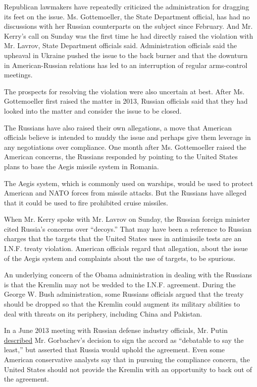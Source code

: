 Republican lawmakers have repeatedly criticized the administration for
dragging its feet on the issue. Ms. Gottemoeller, the State Department
official, has had no discussions with her Russian counterparts on the
subject since February. And Mr. Kerry's call on Sunday was the first
time he had directly raised the violation with Mr. Lavrov, State
Department officials said. Administration officials said the upheaval in
Ukraine pushed the issue to the back burner and that the downturn in
American-Russian relations has led to an interruption of regular
arms-control meetings.

The prospects for resolving the violation were also uncertain at best.
After Ms. Gottemoeller first raised the matter in 2013, Russian
officials said that they had looked into the matter and consider the
issue to be closed.

The Russians have also raised their own allegations, a move that
American officials believe is intended to muddy the issue and perhaps
give them leverage in any negotiations over compliance. One month after
Ms. Gottemoeller raised the American concerns, the Russians responded by
pointing to the United States plans to base the Aegis missile system in
Romania.

The Aegis system, which is commonly used on warships, would be used to
protect American and NATO forces from missile attacks. But the Russians
have alleged that it could be used to fire prohibited cruise missiles.

When Mr. Kerry spoke with Mr. Lavrov on Sunday, the Russian foreign
minister cited Russia's concerns over ``decoys.'' That may have been a
reference to Russian charges that the targets that the United States
uses in antimissile tests are an I.N.F. treaty violation. American
officials regard that allegation, about the issue of the Aegis system
and complaints about the use of targets, to be spurious.

An underlying concern of the Obama administration in dealing with the
Russians is that the Kremlin may not be wedded to the I.N.F. agreement.
During the George W. Bush administration, some Russians officials argued
that the treaty should be dropped so that the Kremlin could augment its
military abilities to deal with threats on its periphery, including
China and Pakistan.

In a June 2013 meeting with Russian defense industry officials, Mr.
Putin \href{http://eng.news.kremlin.ru/news/5615}{described} Mr.
Gorbachev's decision to sign the accord as ``debatable to say the
least,'' but asserted that Russia would uphold the agreement. Even some
American conservative analysts say that in pursuing the compliance
concern, the United States should not provide the Kremlin with an
opportunity to back out of the agreement.


